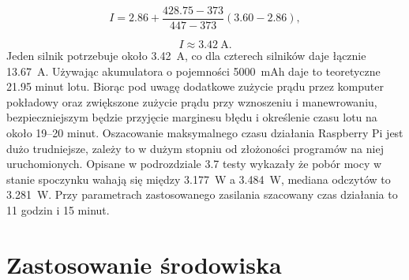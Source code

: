 \documentclass[a4paper,12pt]{book}
\begin{document}
        \[
        I = 2.86 + \frac{428.75 - 373}{447 - 373}(3.60 - 2.86),
        \]

        \[
        I \approx 3.42\ \text{A}.
        \]
        Jeden silnik potrzebuje około 3.42~A, co dla czterech silników daje łącznie 13.67~A. Używając akumulatora o pojemności 5000~mAh daje to teoretyczne 21.95 minut lotu. Biorąc pod uwagę dodatkowe zużycie prądu przez komputer pokładowy oraz 
        zwiększone zużycie prądu przy wznoszeniu i manewrowaniu, bezpieczniejszym będzie przyjęcie marginesu błędu i określenie czasu lotu na około 19--20 minut. Oszacowanie maksymalnego czasu działania Raspberry Pi jest dużo trudniejsze, 
        zależy to w dużym stopniu od złożoności programów na niej uruchomionych. Opisane w podrozdziale 3.7 testy wykazały że pobór mocy w stanie spoczynku wahają się między 3.177~W a 3.484~W, mediana odczytów to 3.281~W. 
        Przy parametrach zastosowanego zasilania szacowany czas działania to 11 godzin i 15 minut.
\chapter{Zastosowanie środowiska}
\end{document}
